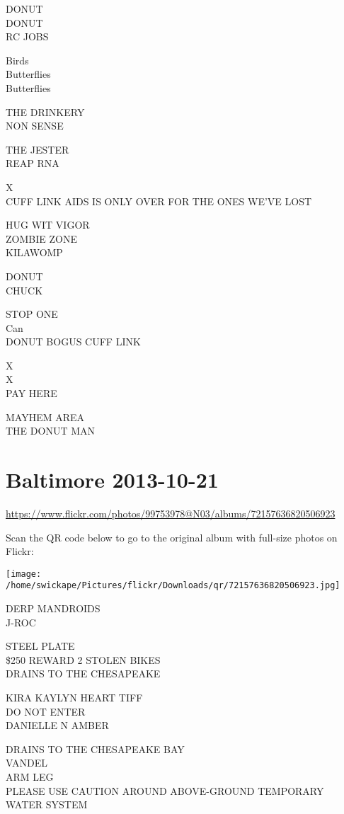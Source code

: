 \documentclass[10pt,letterpaper]{article}
\begin{document}
DONUT\\
DONUT\\
RC JOBS

Birds\\
Butterflies\\
Butterflies

THE DRINKERY\\
NON SENSE

THE JESTER\\
REAP RNA

X\\
CUFF LINK AIDS IS ONLY OVER FOR THE ONES WE'VE LOST

HUG WIT VIGOR\\
ZOMBIE ZONE\\
KILAWOMP

DONUT\\
CHUCK

STOP ONE\\
Can\\
DONUT BOGUS CUFF LINK

X\\
X\\
PAY HERE

MAYHEM AREA\\
THE DONUT MAN
\pagebreak

\section*{Baltimore 2013-10-21}

\url{https://www.flickr.com/photos/99753978@N03/albums/72157636820506923}

Scan the QR code below to go to the original album with full-size photos on Flickr:

\texttt{[image: /home/swickape/Pictures/flickr/Downloads/qr/72157636820506923.jpg]}
\pagebreak

DERP MANDROIDS\\
J{-}ROC

STEEL PLATE\\
\$250 REWARD 2 STOLEN BIKES\\
DRAINS TO THE CHESAPEAKE

KIRA KAYLYN HEART TIFF\\
DO NOT ENTER\\
DANIELLE N AMBER

DRAINS TO THE CHESAPEAKE BAY\\
VANDEL\\
ARM LEG\\
PLEASE USE CAUTION AROUND ABOVE{-}GROUND TEMPORARY WATER SYSTEM
\end{document}
